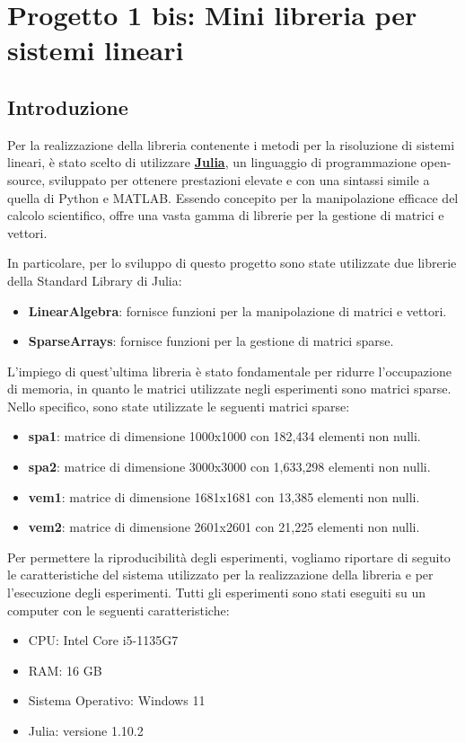 \chapter{Progetto 1 bis: Mini libreria per sistemi lineari}
\section{Introduzione}
Per la realizzazione della libreria contenente i metodi per la risoluzione di
sistemi lineari, è stato scelto di utilizzare \href{https://julialang.org/}{\textbf{Julia}},
un linguaggio di programmazione open-source, sviluppato per ottenere prestazioni
elevate e con una sintassi simile a quella di Python e MATLAB. Essendo concepito
per la manipolazione efficace del calcolo scientifico, offre una vasta gamma di
librerie per la gestione di matrici e vettori.

In particolare, per lo sviluppo di questo progetto sono state utilizzate due
librerie della Standard Library di Julia:
\begin{itemize}
    \item \textbf{LinearAlgebra}: fornisce funzioni per la manipolazione di
          matrici e vettori.
    \item \textbf{SparseArrays}: fornisce funzioni per la gestione di matrici sparse.
\end{itemize}

L'impiego di quest'ultima libreria è stato fondamentale per ridurre l'occupazione
di memoria, in quanto le matrici utilizzate negli esperimenti sono matrici sparse.
Nello specifico, sono state utilizzate le seguenti matrici sparse:
\begin{itemize}
    \item \textbf{spa1}: matrice di dimensione 1000x1000 con 182,434 elementi non nulli.
    \item \textbf{spa2}: matrice di dimensione 3000x3000 con 1,633,298 elementi non nulli.
    \item \textbf{vem1}: matrice di dimensione 1681x1681 con 13,385 elementi non nulli.
    \item \textbf{vem2}: matrice di dimensione 2601x2601 con 21,225 elementi non nulli.
\end{itemize}

Per permettere la riproducibilità degli esperimenti, vogliamo riportare di seguito
le caratteristiche del sistema utilizzato per la realizzazione della libreria e
per l'esecuzione degli esperimenti. Tutti gli esperimenti sono stati eseguiti su
un computer con le seguenti caratteristiche:
\begin{itemize}
    \item CPU: Intel Core i5-1135G7
    \item RAM: 16 GB
    \item Sistema Operativo: Windows 11
    \item Julia: versione 1.10.2
\end{itemize}
